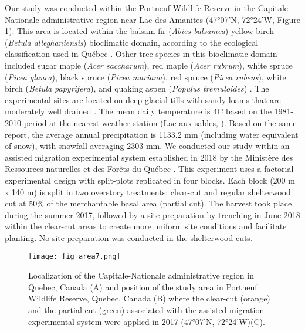 Our study was conducted within the Portneuf Wildlife Reserve in the Capitale-Nationale administrative region near Lac des Amanites (47°07’N, 72°24’W, Figure \ref{fig:area}). 
This area is located within the balsam fir (\textit{Abies balsamea})-yellow birch (\textit{Betula alleghaniensis}) bioclimatic domain, according to the ecological classification used in Québec \citep{saucierChapitreEcologieForestiere2009}. 
Other tree species in this bioclimatic domain included sugar maple (\textit{Acer saccharum}), red maple (\textit{Acer rubrum}), white spruce (\textit{Picea glauca}), black spruce (\textit{Picea mariana}), red spruce (\textit{Picea rubens}), white birch (\textit{Betula papyrifera}), and quaking aspen (\textit{Populus tremuloides}) \citep{olaBelowgroundCarbonStocks2024}. 
The experimental sites are located on deep glacial tills with sandy loams that are moderately well drained \citep{CanadianSystemSoil1998}. 
The mean daily temperature is 4C based on the 1981-2010 period at the nearest weather station (Lac aux sables, \citealp{environmentcanadaCanadianClimateNormals2019}). 
Based on the same report, the average annual precipitation is 1133.2 mm (including water equivalent of snow), with snowfall averaging 2303 mm. 
We conducted our study within an assisted migration experimental system established in 2018 by the Ministère des Ressources naturelles et des Forêts du Québec \citep{Champagne2021Seedlingresponse}. 
This experiment uses a factorial experimental design with split-plots replicated in four blocks. 
Each block (200 m x 140 m) is split in two overstory treatments: clear-cut and regular shelterwood cut at 50\% of the merchantable basal area (partial cut). 
The harvest took place during the summer 2017, followed by a site preparation by trenching in June 2018 within the clear-cut areas to create more uniform site conditions and facilitate planting. 
No site preparation was conducted in the shelterwood cuts.

\pagebreak

\begin{figure}[ht!]
	\centering
	\texttt{[image: fig\_area7.png]}
	\caption[Localization of the Capitale-Nationale administrative region in Quebec, Canada and position of the study area near Lac des Amanites in Portneuf Wildlife Reserve, Quebec, Canada.]
  {Localization of the Capitale-Nationale administrative region in Quebec, Canada (A) and position of the study area in Portneuf Wildlife Reserve, Quebec, Canada (B) where the clear-cut (orange) and the partial cut (green) associated with the assisted migration experimental system were applied in 2017 (47°07'N, 72°24'W)(C).}
	\label{fig:area}
	\end{figure}  


